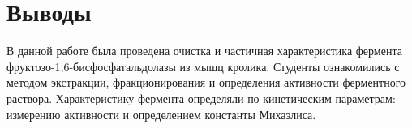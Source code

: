\section{Выводы}
В данной работе была проведена очистка и частичная характеристика фермента
фруктозо-1,6-бисфосфатальдолазы из мышц кролика. Студенты ознакомились с методом экстракции,
фракционирования и определения активности ферментного раствора. Характеристику фермента
определяли по кинетическим параметрам: измерению активности и определением константы Михаэлиса.

